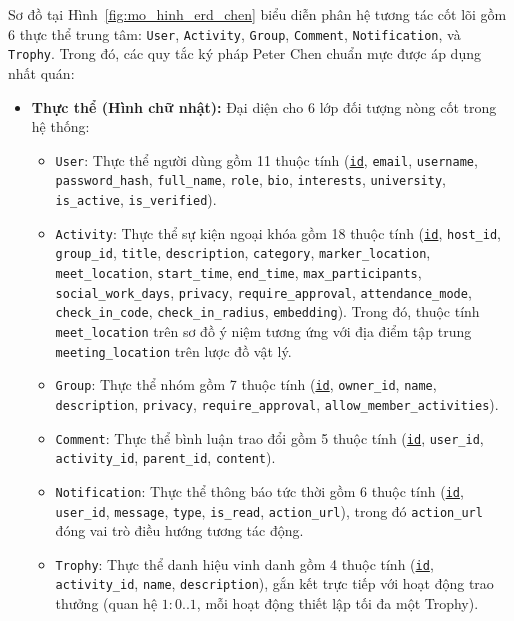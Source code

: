 Sơ đồ tại Hình~\ref{fig:mo_hinh_erd_chen} biểu diễn phân hệ tương tác cốt lõi gồm 6 thực thể trung tâm: \texttt{User}, \texttt{Activity}, \texttt{Group}, \texttt{Comment}, \texttt{Notification}, và \texttt{Trophy}. Trong đó, các quy tắc ký pháp Peter Chen chuẩn mực được áp dụng nhất quán:
\begin{itemize}
    \item \textbf{Thực thể (Hình chữ nhật):} Đại diện cho 6 lớp đối tượng nòng cốt trong hệ thống:
    \begin{itemize}
        \item \texttt{User}: Thực thể người dùng gồm 11 thuộc tính (\underline{\texttt{id}}, \texttt{email}, \texttt{username}, \texttt{password\_hash}, \texttt{full\_name}, \texttt{role}, \texttt{bio}, \texttt{interests}, \texttt{university}, \texttt{is\_active}, \texttt{is\_verified}).
        \item \texttt{Activity}: Thực thể sự kiện ngoại khóa gồm 18 thuộc tính (\underline{\texttt{id}}, \texttt{host\_id}, \texttt{group\_id}, \texttt{title}, \texttt{description}, \texttt{category}, \texttt{marker\_location}, \texttt{meet\_location}, \texttt{start\_time}, \texttt{end\_time}, \texttt{max\_participants}, \texttt{social\_work\_days}, \texttt{privacy}, \texttt{require\_approval}, \texttt{attendance\_mode}, \texttt{check\_in\_code}, \texttt{check\_in\_radius}, \texttt{embedding}). Trong đó, thuộc tính \texttt{meet\_location} trên sơ đồ ý niệm tương ứng với địa điểm tập trung \texttt{meeting\_location} trên lược đồ vật lý.
        \item \texttt{Group}: Thực thể nhóm gồm 7 thuộc tính (\underline{\texttt{id}}, \texttt{owner\_id}, \texttt{name}, \texttt{description}, \texttt{privacy}, \texttt{require\_approval}, \texttt{allow\_member\_activities}).
        \item \texttt{Comment}: Thực thể bình luận trao đổi gồm 5 thuộc tính (\underline{\texttt{id}}, \texttt{user\_id}, \texttt{activity\_id}, \texttt{parent\_id}, \texttt{content}).
        \item \texttt{Notification}: Thực thể thông báo tức thời gồm 6 thuộc tính (\underline{\texttt{id}}, \texttt{user\_id}, \texttt{message}, \texttt{type}, \texttt{is\_read}, \texttt{action\_url}), trong đó \texttt{action\_url} đóng vai trò điều hướng tương tác động.
        \item \texttt{Trophy}: Thực thể danh hiệu vinh danh gồm 4 thuộc tính (\underline{\texttt{id}}, \texttt{activity\_id}, \texttt{name}, \texttt{description}), gắn kết trực tiếp với hoạt động trao thưởng (quan hệ $1:0..1$, mỗi hoạt động thiết lập tối đa một Trophy).

\end{itemize}
\end{itemize}
